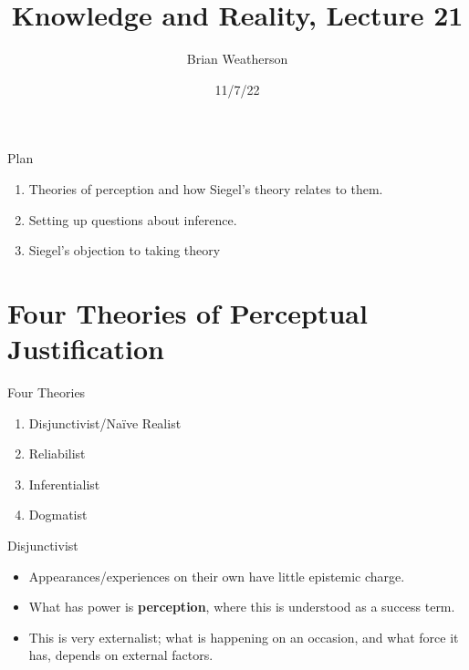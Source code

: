 \documentclass[
  17pt,
  letterpaper,
  ignorenonframetext,
  aspectratio=169,
  xcolor={dvipsnames}]{beamer}
\title{Knowledge and Reality, Lecture 21}
\author{Brian Weatherson}
\date{11/7/22}
\providecommand{\tightlist}{%
  \setlength{\itemsep}{0pt}\setlength{\parskip}{0pt}}\usepackage{longtable,booktabs,array}
\begin{document}
\frame{\titlepage}
\ifdefined\Shaded\renewenvironment{Shaded}{\begin{tcolorbox}[boxrule=0pt, interior hidden, borderline west={3pt}{0pt}{shadecolor}, frame hidden, breakable, enhanced, sharp corners]}{\end{tcolorbox}}\fi

\begin{frame}{Plan}
\protect\hypertarget{plan}{}
\begin{enumerate}[<+->]
\tightlist
\item
  Theories of perception and how Siegel's theory relates to them.
\item
  Setting up questions about inference.
\item
  Siegel's objection to taking theory
\end{enumerate}
\end{frame}

\hypertarget{four-theories-of-perceptual-justification}{%
\section{Four Theories of Perceptual
Justification}\label{four-theories-of-perceptual-justification}}

\begin{frame}{Four Theories}
\protect\hypertarget{four-theories}{}
\begin{enumerate}[<+->]
\tightlist
\item
  Disjunctivist/Naïve Realist
\item
  Reliabilist
\item
  Inferentialist
\item
  Dogmatist
\end{enumerate}
\end{frame}

\begin{frame}{Disjunctivist}
\protect\hypertarget{disjunctivist}{}
\begin{itemize}[<+->]
\tightlist
\item
  Appearances/experiences on their own have little epistemic charge.
\item
  What has power is \textbf{perception}, where this is understood as a
  success term.
\item
  This is very externalist; what is happening on an occasion, and what
  force it has, depends on external factors.
\end{itemize}
\end{frame}
\end{document}
